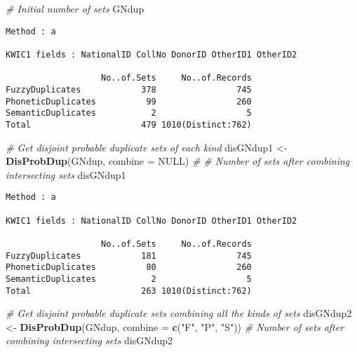 \documentclass[]{article}
\newenvironment{Shaded}{\begin{snugshade}}{\end{snugshade}}
\newcommand{\CommentTok}[1]{\textcolor[rgb]{0.56,0.35,0.01}{\textit{#1}}}
\newcommand{\DataTypeTok}[1]{\textcolor[rgb]{0.13,0.29,0.53}{#1}}
\newcommand{\KeywordTok}[1]{\textcolor[rgb]{0.13,0.29,0.53}{\textbf{#1}}}
\newcommand{\NormalTok}[1]{#1}
\newcommand{\OtherTok}[1]{\textcolor[rgb]{0.56,0.35,0.01}{#1}}
\newcommand{\StringTok}[1]{\textcolor[rgb]{0.31,0.60,0.02}{#1}}
\begin{document}
\begin{Shaded}
\begin{Highlighting}[]
\CommentTok{# Initial number of sets}
\NormalTok{GNdup}
\end{Highlighting}
\end{Shaded}

\begin{verbatim}
Method : a

KWIC1 fields : NationalID CollNo DonorID OtherID1 OtherID2
 
                   No..of.Sets     No..of.Records
FuzzyDuplicates            378                745
PhoneticDuplicates          99                260
SemanticDuplicates           2                  5
Total                      479 1010(Distinct:762)
\end{verbatim}

\begin{Shaded}
\begin{Highlighting}[]
\CommentTok{# Get disjoint probable duplicate sets of each kind}
\NormalTok{disGNdup1 <-}\StringTok{ }\KeywordTok{DisProbDup}\NormalTok{(GNdup, }\DataTypeTok{combine =} \OtherTok{NULL}\NormalTok{)}
\CommentTok{# # Number of sets after combining intersecting sets}
\NormalTok{disGNdup1}
\end{Highlighting}
\end{Shaded}

\begin{verbatim}
Method : a

KWIC1 fields : NationalID CollNo DonorID OtherID1 OtherID2
 
                   No..of.Sets     No..of.Records
FuzzyDuplicates            181                745
PhoneticDuplicates          80                260
SemanticDuplicates           2                  5
Total                      263 1010(Distinct:762)
\end{verbatim}

\begin{Shaded}
\begin{Highlighting}[]
\CommentTok{# Get disjoint probable duplicate sets combining all the kinds of sets}
\NormalTok{disGNdup2 <-}\StringTok{ }\KeywordTok{DisProbDup}\NormalTok{(GNdup, }\DataTypeTok{combine =} \KeywordTok{c}\NormalTok{(}\StringTok{"F"}\NormalTok{, }\StringTok{"P"}\NormalTok{, }\StringTok{"S"}\NormalTok{))}
\CommentTok{# Number of sets after combining intersecting sets}
\NormalTok{disGNdup2}
\end{Highlighting}
\end{Shaded}
\end{document}
